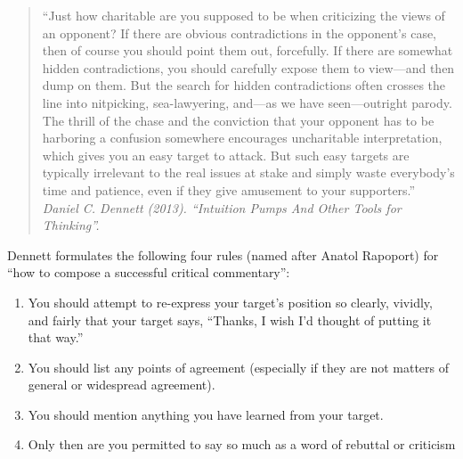 \begin{quotation}
“Just how charitable are you supposed to be when criticizing the views of an opponent? If there are obvious contradictions in the opponent’s case, then of course you should point them out, forcefully. If there are somewhat hidden contradictions, you should carefully expose them to view—and then dump on them. But the search for hidden contradictions often crosses the line into nitpicking, sea-lawyering, and—as we have seen—outright parody. The thrill of the chase and the conviction that your opponent has to be harboring a confusion somewhere encourages uncharitable interpretation, which gives you an easy target to attack. But such easy targets are typically irrelevant to the real issues at stake and simply waste everybody’s time and patience, even if they give amusement to your supporters.''\\
\emph{Daniel C. Dennett (2013). “Intuition Pumps And Other Tools for Thinking”. }
\end{quotation}


Dennett formulates the following four rules (named after
Anatol Rapoport) for “how to compose a successful critical
commentary”:
\begin{enumerate}
\item You should attempt to re-express your target’s position so
clearly, vividly, and fairly that your target says, “Thanks, I
wish I’d thought of putting it that way.”
\item You should list any points of agreement (especially if they
are not matters of general or widespread agreement).
\item You should mention anything you have learned from your
target.
\item Only then are you permitted to say so much as a word of
rebuttal or criticism
\end{enumerate}


